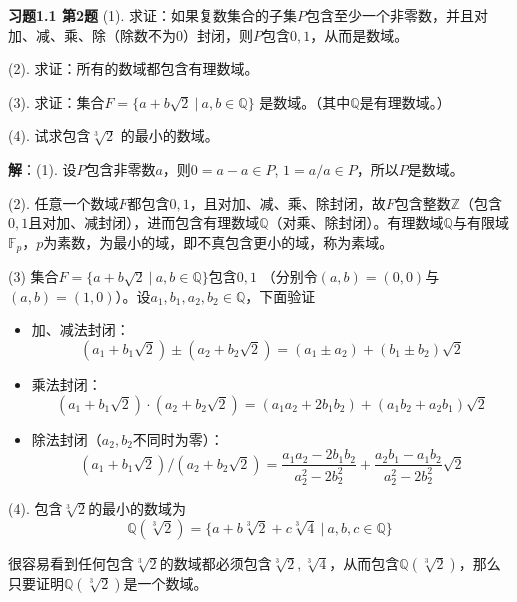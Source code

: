 \newpageorvspace

{\bf 习题1.1 第2题} (1). 求证：如果复数集合的子集$P$包含至少一个非零数，并且对加、减、乘、除（除数不为$0$）封闭，则$P$包含$0,1$，从而是数域。

(2). 求证：所有的数域都包含有理数域。

(3). 求证：集合$F = \{ a+b\sqrt{2} \ |\ a,b\in\mathbb{Q} \}$ 是数域。（其中$\mathbb{Q}$是有理数域。）

(4). 试求包含$\sqrt[3]{2}$ 的最小的数域。

\newpageorvspace

{\bf 解}：(1). 设$P$包含非零数$a$，则$0 = a-a \in P$, $1 = a/a \in P$，所以$P$是数域。

(2). 任意一个数域$F$都包含$0,1$，且对加、减、乘、除封闭，故$F$包含整数$\mathbb{Z}$（包含$0,1$且对加、减封闭），进而包含有理数域$\mathbb{Q}$（对乘、除封闭）。有理数域$\mathbb{Q}$与有限域$\mathbb{F}_p$，$p$为素数，为最小的域，即不真包含更小的域，称为素域。

(3) 集合$F = \{ a+b\sqrt{2} \ |\ a,b\in\mathbb{Q} \}$包含$0,1$ （分别令$(a,b) = (0,0)$与$(a,b) = (1,0)$）。设$a_1, b_1, a_2, b_2 \in \mathbb{Q}$，下面验证
\begin{itemize}
    \item 加、减法封闭：
    $$(a_1+b_1\sqrt{2}) \pm (a_2+b_2\sqrt{2}) = (a_1 \pm a_2) + (b_1 \pm b_2)\sqrt{2}$$
    \item 乘法封闭：
    $$(a_1+b_1\sqrt{2}) \cdot (a_2+b_2\sqrt{2}) = (a_1a_2+2b_1b_2) + (a_1b_2 + a_2b_1)\sqrt{2}$$
    \item 除法封闭（$a_2, b_2$不同时为零）：
    $$(a_1+b_1\sqrt{2}) / (a_2+b_2\sqrt{2}) = \dfrac{a_1a_2-2b_1b_2}{a_2^2-2b_2^2} + \dfrac{a_2b_1-a_1b_2}{a_2^2-2b_2^2}\sqrt{2}$$
\end{itemize}

(4). 包含$\sqrt[3]{2}$的最小的数域为
$$\mathbb{Q}(\sqrt[3]{2}) = \{ a + b\sqrt[3]{2} + c\sqrt[3]{4} \ |\ a,b,c\in\mathbb{Q} \}$$

很容易看到任何包含$\sqrt[3]{2}$的数域都必须包含$\sqrt[3]{2}, \sqrt[3]{4}$，从而包含$\mathbb{Q}(\sqrt[3]{2})$，那么只要证明$\mathbb{Q}(\sqrt[3]{2})$是一个数域。

